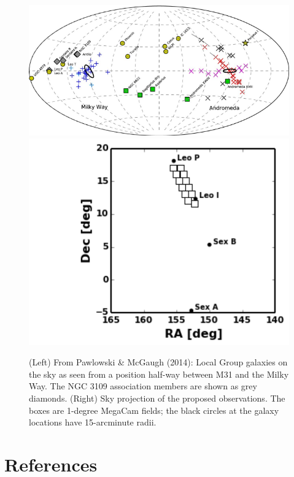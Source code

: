\thispagestyle{empty}


\begin{figure}
\includegraphics[scale=0.9]{pm14_fig2}
\includegraphics[scale=0.6]{fields_leoi_new}
\caption{(Left)  From Pawlowski \& McGaugh (2014): Local Group galaxies on the sky as seen from a position half-way between M31 and the Milky Way.
The NGC 3109 association members are shown as grey diamonds.
(Right) Sky projection of the proposed observations. The boxes are 1-degree MegaCam fields; the black circles at the galaxy
locations have 15-arcminute radii. 
}
\end{figure}



\section*{References}

